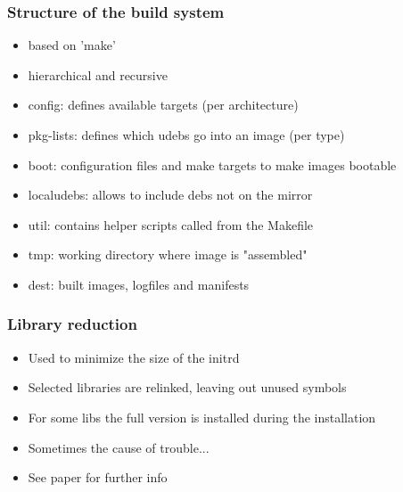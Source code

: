\documentclass{beamer}
\begin{document}
\begin{frame}
  \frametitle{Structure of the build system}
	\begin{itemize}
	\item
		based on 'make'
	\item
		hierarchical and recursive
	\linebreak
	\item
		config: defines available targets (per architecture)
	\item
		pkg-lists: defines which udebs go into an image (per type)
	\item
		boot: configuration files and make targets to make images bootable
	\item
		localudebs: allows to include debs not on the mirror
	\item
		util: contains helper scripts called from the Makefile
	\item
		tmp: working directory where image is "assembled"
	\item
		dest: built images, logfiles and manifests
	\end{itemize}
\end{frame}

\begin{frame}
  \frametitle{Library reduction}
	\begin{itemize}
	\item
		Used to minimize the size of the initrd
	\item
		Selected libraries are relinked, leaving out unused symbols
	\item
		For some libs the full version is installed during the installation
	\item
		Sometimes the cause of trouble...
	\item
		See paper for further info
	\end{itemize}
\end{frame}
\end{document}
